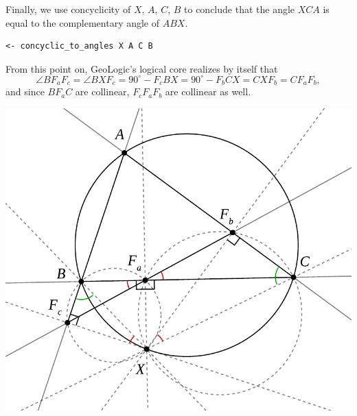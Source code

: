 \documentclass[runningheads]{llncs}
\begin{document}
Finally, we use concyclicity of $X$, $A$, $C$, $B$ to conclude that
the angle $XCA$ is equal to the complementary angle of $ABX$.

\begin{verbatim}
<- concyclic_to_angles X A C B
\end{verbatim}

From this point on, GeoLogic's logical core realizes by itself that
$$
\angle BF_aF_c = \angle BXF_c = 90^\circ-F_cBX = 90^\circ-F_bCX =
CXF_b = CF_aF_b,
$$
and since $BF_aC$ are collinear, $F_cF_aF_b$ are collinear as well.

\bigskip
\centerline{%
  \includegraphics[width = \imgwidth]{simson5.pdf}%
}
\end{document}
